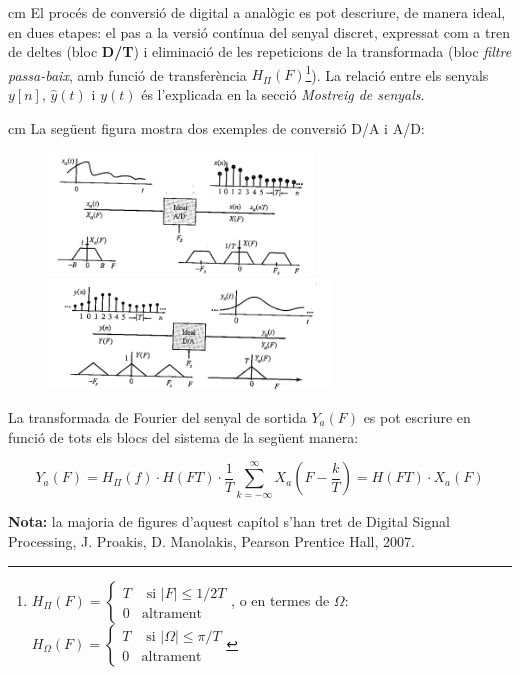 \documentclass{article}
\begin{document}
 cm
El proc\'es de conversi\'o de digital a anal\`ogic es pot descriure, de manera ideal, en dues etapes:
el pas a la versi\'o cont\'inua del senyal discret, expressat com a tren de deltes (bloc \textbf{D/T})
i eliminaci\'o de les repeticions de la transformada (bloc \textit{filtre passa-baix}, amb funci\'o de
transfer\`encia $H_{\Pi}(F)$\footnote{$H_{\Pi}(F)=\begin{cases} T & \text{ si } |F| \leq 1/2T \\ 0 & \text{altrament} \end{cases}$,
o en termes de $\Omega$: $H_{\Omega}(F)=\begin{cases} T & \text{ si } |\Omega| \leq \pi/T \\ 0 & \text{altrament} \end{cases}$}). 
La relació entre els senyals $y[n]$, $\hat{y}(t)$ i $y(t)$ és l'explicada en la secció \textit{Mostreig de senyals}.

 cm
\noindent
La seg\"uent figura mostra dos exemples de conversi\'o D/A i A/D:

\begin{figure}[htbp]
\begin{center}
\includegraphics[width=7cm]{exAD.png}
$\qquad$ $\quad$
\includegraphics[width=7.5cm]{exDA.png}
\end{center}
\end{figure}


La transformada de Fourier del senyal de sortida $Y_a(F)$ es pot escriure en funci\'o de tots els blocs
del sistema de la seg\"uent manera:

\[
Y_a(F)=H_{\Pi}(f) \cdot H(FT) \cdot \frac{1}{T} \sum_{k=-\infty}^\infty X_a(F-\frac{k}{T})=H(FT) \cdot X_a(F)
\]


\vskip 2cm
\noindent
\textbf{Nota:} la majoria de figures d'aquest cap\'itol s'han tret de Digital Signal Processing, J. Proakis, D. Manolakis, Pearson Prentice Hall, 2007.
\end{document}
